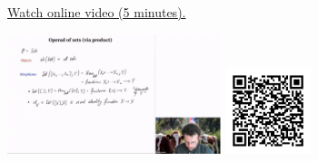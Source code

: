
\begin{minipage}{10cm}
    \href{https://act4e-spring21.netlify.app/videos/spring2021-operads-a:operad-sets.html}{Watch online video (5 minutes).}
        
    \href{https://act4e-spring21.netlify.app/videos/spring2021-operads-a:operad-sets.html}{\includegraphics[height=3.5cm]{spring2021-operads-a:operad-sets/thumbnails.jpg}}
    \href{https://act4e-spring21.netlify.app/videos/spring2021-operads-a:operad-sets.html}{\includegraphics[height=2.5cm]{spring2021-operads-a:operad-sets/qrcode.png}}
\end{minipage}

